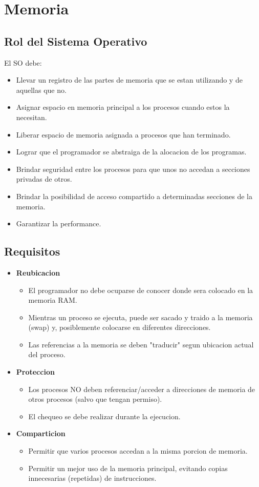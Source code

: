 \section{Memoria}

\subsection{Rol del Sistema Operativo}
El SO debe:
\begin{itemize}
    \item Llevar un registro de las partes de memoria que se estan utilizando y de aquellas que no.
    \item Asignar espacio en memoria principal a los procesos cuando estos la necesitan.
    \item Liberar espacio de memoria asignada a procesos que han terminado.
    \item Lograr que el programador se abstraiga de la alocacion de los programas.
    \item Brindar seguridad entre los procesos para que unos no accedan a secciones privadas de otros.
    \item Brindar la posibilidad de acceso compartido a determinadas secciones de la memoria.
    \item Garantizar la performance.
\end{itemize}

\subsection{Requisitos}
\begin{itemize}
    \item \textbf{Reubicacion}
    \begin{itemize}
        \item El programador no debe ocuparse de conocer donde sera colocado en la memoria RAM.
        \item Mientras un proceso se ejecuta, puede ser sacado y traido a la memoria (swap) y, posiblemente colocarse en diferentes direcciones.
        \item Las referencias a la memoria se deben "traducir" segun ubicacion actual del proceso.
    \end{itemize}
    \item \textbf{Proteccion}
    \begin{itemize}
        \item Los procesos NO deben referenciar/acceder a direcciones de memoria de otros procesos (salvo que tengan permiso).
        \item El chequeo se debe realizar durante la ejecucion.
    \end{itemize}
\item \textbf{Comparticion}
    \begin{itemize}
        \item Permitir que varios procesos accedan a la misma porcion de memoria.
        \item Permitir un mejor uso de la memoria principal, evitando copias innecesarias (repetidas) de instrucciones.
    \end{itemize}
\end{itemize}

